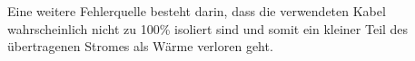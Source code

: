 \documentclass[a4paper,12pt]{article}
\begin{document}
Eine weitere Fehlerquelle besteht darin, dass die verwendeten Kabel wahrscheinlich nicht zu 100\% isoliert sind und somit ein kleiner Teil des übertragenen Stromes als Wärme verloren geht.




\end{document}
